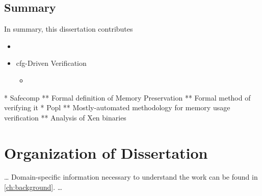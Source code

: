 \subsection{Summary}
In summary, this dissertation contributes 
\begin{itemize}
  \item 
  \item \ac{cfg}-Driven Verification
  \begin{itemize}
    \item 
  \end{itemize}
\end{itemize}
  
* Safecomp
** Formal definition of Memory Preservation
** Formal method of verifying it
* Popl
** Mostly-automated methodology for memory usage verification
** Analysis of Xen binaries

\section{Organization of Dissertation}

\todo\dots
Domain-specific information necessary to understand the work
can be found in \cref{ch:background}.
\todo\dots
